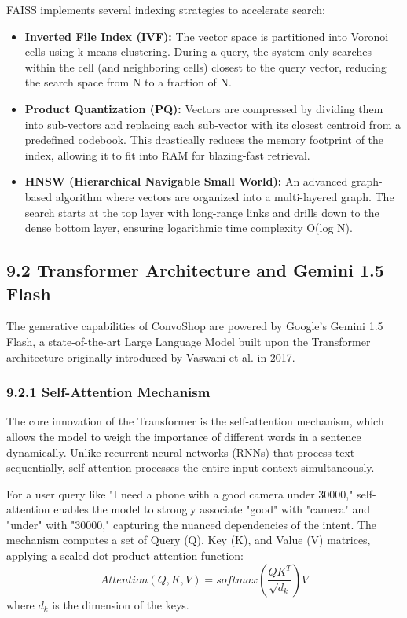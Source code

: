 FAISS implements several indexing strategies to accelerate search:
\begin{itemize}
    \item \textbf{Inverted File Index (IVF):} The vector space is partitioned into Voronoi cells using k-means clustering. During a query, the system only searches within the cell (and neighboring cells) closest to the query vector, reducing the search space from N to a fraction of N.
    \item \textbf{Product Quantization (PQ):} Vectors are compressed by dividing them into sub-vectors and replacing each sub-vector with its closest centroid from a predefined codebook. This drastically reduces the memory footprint of the index, allowing it to fit into RAM for blazing-fast retrieval.
    \item \textbf{HNSW (Hierarchical Navigable Small World):} An advanced graph-based algorithm where vectors are organized into a multi-layered graph. The search starts at the top layer with long-range links and drills down to the dense bottom layer, ensuring logarithmic time complexity O(log N).
\end{itemize}

\subsection*{9.2 Transformer Architecture and Gemini 1.5 Flash}
The generative capabilities of ConvoShop are powered by Google's Gemini 1.5 Flash, a state-of-the-art Large Language Model built upon the Transformer architecture originally introduced by Vaswani et al. in 2017.

\subsubsection*{9.2.1 Self-Attention Mechanism}
The core innovation of the Transformer is the self-attention mechanism, which allows the model to weigh the importance of different words in a sentence dynamically. Unlike recurrent neural networks (RNNs) that process text sequentially, self-attention processes the entire input context simultaneously. 

For a user query like "I need a phone with a good camera under 30000," self-attention enables the model to strongly associate "good" with "camera" and "under" with "30000," capturing the nuanced dependencies of the intent. The mechanism computes a set of Query (Q), Key (K), and Value (V) matrices, applying a scaled dot-product attention function:
\[ Attention(Q, K, V) = softmax\left(\frac{QK^T}{\sqrt{d_k}}\right)V \]
where \(d_k\) is the dimension of the keys.

